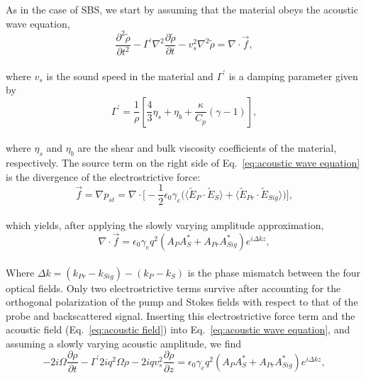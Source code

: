 As in the case of SBS\cite{boyd2020nonlinear}, we start by assuming that the material obeys the acoustic wave equation,
\\
\begin{equation}
    \frac{\partial^{2}\tilde{\rho}}{\partial t^{2}} - \Gamma^{\prime}\nabla^{2}\frac{\partial\tilde{\rho}}{\partial t} - v_{s}^{2}\nabla^{2}\tilde{\rho} = \nabla\cdot\vec{f},
    \label{eq:acoustic wave equation}
\end{equation}
\\
\noindent where \(v_{s}\) is the sound speed in the material and \(\Gamma^{\prime}\) is a damping parameter given by
\\
\begin{equation}
    \Gamma^{\prime} = \frac{1}{\rho}\left[\frac{4}{3}\eta_{s} + \eta_{b} + \frac{\kappa}{C_{p}}(\gamma - 1)\right],
\end{equation}
\\
\noindent where \(\eta_{s}\) and \(\eta_{b}\) are the shear and bulk viscosity coefficients of the material, respectively. The source term on the right side of Eq.~\ref{eq:acoustic wave equation} is the divergence of the electrostrictive force:
\\
\begin{equation}
    \vec{f} = \nabla p_{st} = \nabla \cdot \Bigg[-\frac{1}{2}\epsilon_{0}\gamma_{e}\Big(\langle\tilde{E}_{P} \cdot \tilde{E}_{S}\rangle + \langle\tilde{E}_{Pr} \cdot \tilde{E}_{Sig}\rangle\Big)\Bigg],
\end{equation}
\\
which yields, after applying the slowly varying amplitude approximation,
\\
\begin{equation}
    \nabla\cdot\vec{f} = \epsilon_{0}\gamma_{e}q^{2}(A_{P}A_{S}^{*} + A_{Pr}A_{Sig}^{*})e^{i\Delta kz},
\end{equation}
\\
Where \(\Delta k = (k_{Pr} - k_{Sig}) - (k_{P} - k_{S})\) is the phase mismatch between the four optical fields. Only two electrostrictive terms survive after accounting for the orthogonal polarization of the pump and Stokes fields with respect to that of the probe and backscattered signal. Inserting this electrostrictive force term and the acoustic field (Eq.~\ref{eq:acoustic field}) into Eq.~\ref{eq:acoustic wave equation}, and assuming a slowly varying acoustic amplitude, we find
\\
\begin{equation}
    -2i\Omega\frac{\partial\rho}{\partial t} - \Gamma^{\prime}2iq^{2}\Omega\rho - 2iqv_{s}^{2}\frac{\partial\rho}{\partial z} = \epsilon_{0}\gamma_{e}q^{2}(A_{P}A_{S}^{*} + A_{Pr}A_{Sig}^{*})e^{i\Delta kz},
\end{equation}
